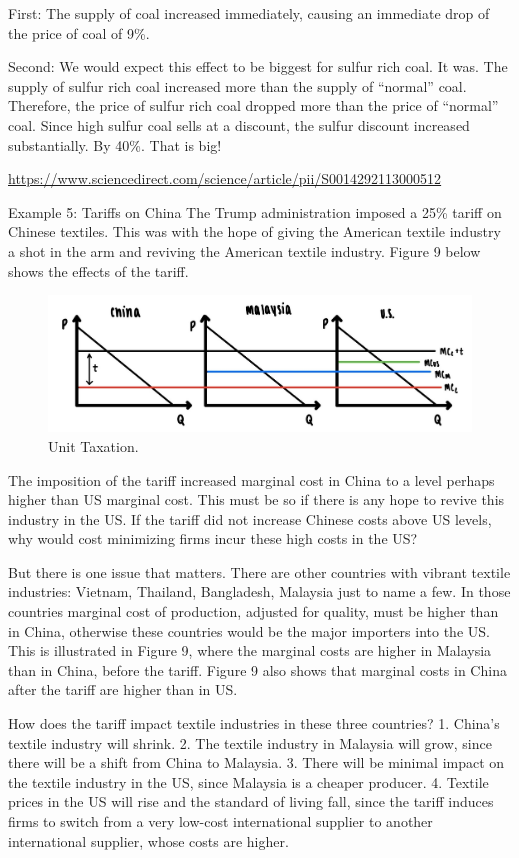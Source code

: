 \documentclass[
]{book}
\begin{document}
First: The supply of coal increased immediately, causing an immediate drop of the price of coal of 9\%.

Second: We would expect this effect to be biggest for sulfur rich coal. It was. The supply of sulfur rich coal increased more than the supply of ``normal'' coal. Therefore, the price of sulfur rich coal dropped more than the price of ``normal'' coal. Since high sulfur coal sells at a discount, the sulfur discount increased substantially. By 40\%. That is big!

\url{https://www.sciencedirect.com/science/article/pii/S0014292113000512}

Example 5: Tariffs on China
The Trump administration imposed a 25\% tariff on Chinese textiles. This was with the hope of giving the American textile industry a shot in the arm and reviving the American textile industry. Figure 9 below shows the effects of the tariff.

\begin{figure}

{\centering \includegraphics[width=0.5\linewidth]{img/compmarkets/fig9} 

}

\caption{Unit Taxation.}\label{fig:compmarkets09}
\end{figure}

The imposition of the tariff increased marginal cost in China to a level perhaps higher than US marginal cost. This must be so if there is any hope to revive this industry in the US. If the tariff did not increase Chinese costs above US levels, why would cost minimizing firms incur these high costs in the US?

But there is one issue that matters. There are other countries with vibrant textile industries: Vietnam, Thailand, Bangladesh, Malaysia just to name a few. In those countries marginal cost of production, adjusted for quality, must be higher than in China, otherwise these countries would be the major importers into the US. This is illustrated in Figure 9, where the marginal costs are higher in Malaysia than in China, before the tariff. Figure 9 also shows that marginal costs in China after the tariff are higher than in US.

How does the tariff impact textile industries in these three countries?
1. China's textile industry will shrink.
2. The textile industry in Malaysia will grow, since there will be a shift from China to Malaysia.
3. There will be minimal impact on the textile industry in the US, since Malaysia is a cheaper producer.
4. Textile prices in the US will rise and the standard of living fall, since the tariff induces firms to switch from a very low-cost international supplier to another international supplier, whose costs are higher.
\end{document}
